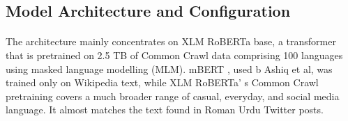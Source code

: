 \documentclass[11pt, a4paper]{article}
\begin{document}
\subsection{Model Architecture and Configuration}
\paragraph{}
The architecture mainly concentrates on XLM RoBERTa base, a transformer that is pretrained on 2.5 TB of Common Crawl data\cite{xlmrobertaresults} comprising 100 languages using masked language modelling (MLM). mBERT , used b Ashiq et al, was trained only on Wikipedia text\cite{mbert2018}, while XLM RoBERTa' s Common Crawl pretraining covers a much broader range of casual, everyday, and social media language. It almost matches the text found in Roman Urdu Twitter posts.
\end{document}

